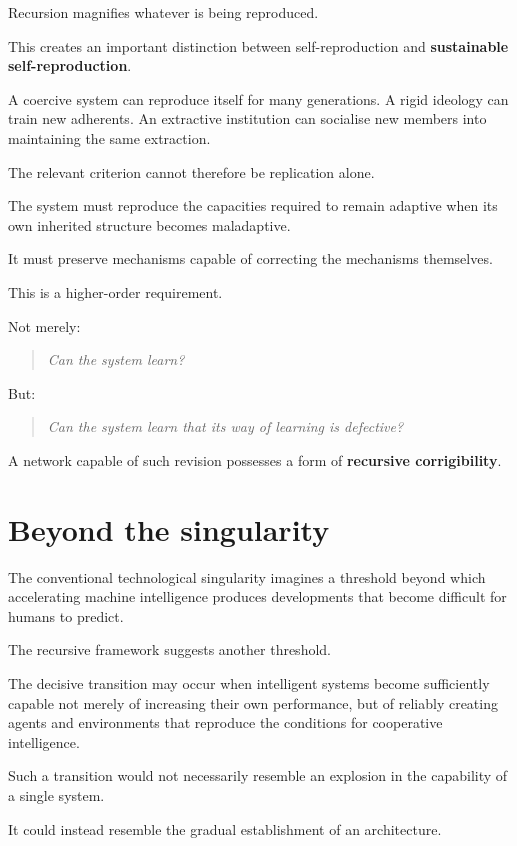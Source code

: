 \documentclass[11pt, a4paper]{article}
\begin{document}
Recursion magnifies whatever is being reproduced.

This creates an important distinction between self-reproduction and \textbf{sustainable self-reproduction}.

A coercive system can reproduce itself for many generations. A rigid ideology can train new adherents. An extractive institution can socialise new members into maintaining the same extraction.

The relevant criterion cannot therefore be replication alone.

The system must reproduce the capacities required to remain adaptive when its own inherited structure becomes maladaptive.

It must preserve mechanisms capable of correcting the mechanisms themselves.

This is a higher-order requirement.

Not merely:

\begin{quote}
    \emph{Can the system learn?}
\end{quote}

But:

\begin{quote}
    \emph{Can the system learn that its way of learning is defective?}
\end{quote}

A network capable of such revision possesses a form of \textbf{recursive corrigibility}.

\section{Beyond the singularity}
The conventional technological singularity imagines a threshold beyond which accelerating machine intelligence produces developments that become difficult for humans to predict.

The recursive framework suggests another threshold.

The decisive transition may occur when intelligent systems become sufficiently capable not merely of increasing their own performance, but of reliably creating agents and environments that reproduce the conditions for cooperative intelligence.

Such a transition would not necessarily resemble an explosion in the capability of a single system.

It could instead resemble the gradual establishment of an architecture.
\end{document}
